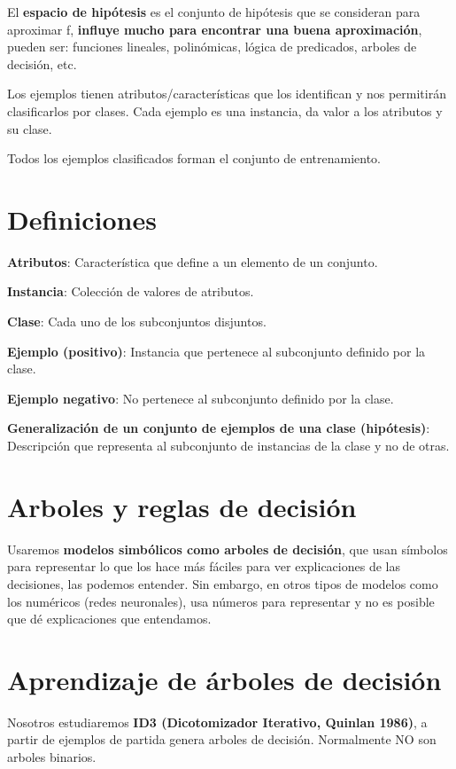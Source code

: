 \documentclass[12pt]{report} %
\begin{document}
El \textbf{espacio de hipótesis} es el conjunto de hipótesis que se
consideran para aproximar f, \textbf{influye mucho para encontrar una
buena aproximación}, pueden ser: funciones lineales, polinómicas, lógica
de predicados, arboles de decisión, etc.

Los ejemplos tienen atributos/características que los identifican y nos
permitirán clasificarlos por clases. Cada ejemplo es una instancia, da
valor a los atributos y su clase.

Todos los ejemplos clasificados forman el conjunto de entrenamiento.

\section{Definiciones}

\textbf{Atributos}: Característica que define a un elemento de un
conjunto.

\textbf{Instancia}: Colección de valores de atributos.

\textbf{Clase}: Cada uno de los subconjuntos disjuntos.

\textbf{Ejemplo (positivo)}: Instancia que pertenece al subconjunto
definido por la clase.

\textbf{Ejemplo negativo}: No pertenece al subconjunto definido por la
clase.

\textbf{Generalización de un conjunto de ejemplos de una
clase (hipótesis)}: Descripción que representa al subconjunto de
instancias de la clase y no de otras.

\section{Arboles y reglas de
decisión}

Usaremos \textbf{modelos simbólicos como arboles de decisión}, que usan
símbolos para representar lo que los hace más fáciles para ver
explicaciones de las decisiones, las podemos entender. Sin embargo, en otros
tipos de modelos como los numéricos (redes neuronales), usa números para
representar y no es posible que dé explicaciones que entendamos.

\section{Aprendizaje de árboles de
decisión}

Nosotros estudiaremos \textbf{ID3 (Dicotomizador Iterativo, Quinlan
1986)}, a partir de ejemplos de partida genera arboles de decisión.
Normalmente NO son arboles binarios.
\end{document}
